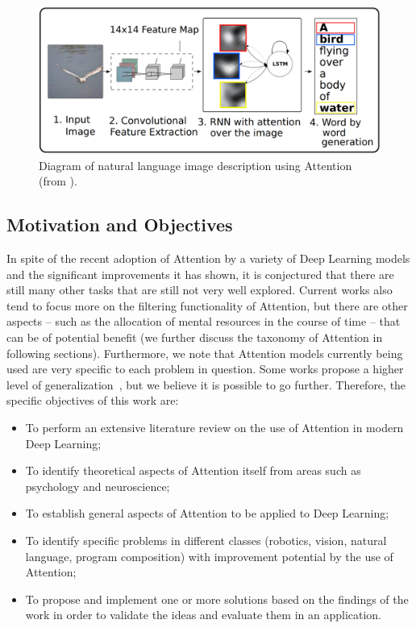 \documentclass[12pt]{article}
\begin{document}
\newpage
\begin{figure}
\begin{center}
	\includegraphics[width=0.7\linewidth]{./img/img_captioning.png}
\caption{
    Diagram of natural language image description using Attention
    (from \cite{ref:img-captioning}).
}
\label{fig:description}
\end{center}
\end{figure}

\subsection{Motivation and Objectives}
In spite of the recent adoption of Attention by a variety of Deep Learning models
and the significant improvements it has shown, it is conjectured that there are still many other tasks
that are still not very well explored.
Current works also tend to focus more on the filtering functionality of Attention,
but there are other aspects
-- such as the allocation of mental resources in the course of time -- that can be of potential benefit
(we further discuss the taxonomy of Attention in following sections).
Furthermore, we note that Attention models currently being used
are very specific to each problem in question.
Some works propose a higher level of generalization~\cite{ref:recurr-models},
but we believe it is possible to go further.
Therefore, the specific objectives of this work are:
\begin{itemize}
    \item To perform an extensive literature review on the use of Attention
        in modern Deep Learning;
    \item To identify theoretical aspects of Attention itself from areas such as psychology and neuroscience;
    \item To establish general aspects of Attention to be applied to Deep Learning;
    \item To identify specific problems in different classes
        (robotics, vision, natural language, program composition) with
        improvement potential by the use of Attention;
    \item To propose and implement one or more solutions based on the findings of the work in order to
        validate the ideas and evaluate them in an application.
\end{itemize}
\end{document}
